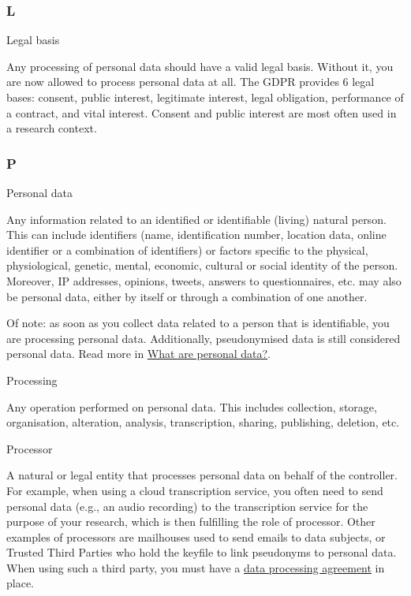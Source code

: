 \documentclass[
]{book}
\begin{document}
\hypertarget{l}{%
\subsubsection{L}\label{l}}

Legal basis

Any processing of personal data should have a valid legal basis. Without it,
you are now allowed to process personal data at all. The GDPR provides 6 legal
bases: consent, public interest, legitimate interest, legal obligation,
performance of a contract, and vital interest. Consent and public interest are
most often used in a research context.

\hypertarget{p}{%
\subsubsection{P}\label{p}}

Personal data

Any information related to an identified or identifiable (living) natural
person. This can include identifiers (name, identification number, location
data, online identifier or a combination of identifiers) or factors specific
to the physical, physiological, genetic, mental, economic, cultural or social
identity of the person. Moreover, IP addresses, opinions, tweets, answers to
questionnaires, etc. may also be personal data, either by itself or through a
combination of one another.

Of note: as soon as you collect data related to a person that is identifiable,
you are processing personal data. Additionally, pseudonymised data is still
considered personal data. Read more in
\protect\hyperlink{personal-data}{What are personal data?}.

Processing

Any operation performed on personal data. This includes collection, storage,
organisation, alteration, analysis, transcription, sharing, publishing, deletion, etc.

Processor

A natural or legal entity that processes personal data on behalf of the
controller. For example, when using a cloud transcription service, you often
need to send personal data (e.g., an audio recording) to the transcription
service for the purpose of your research, which is then fulfilling the role
of processor. Other examples of processors are mailhouses used to send emails
to data subjects, or Trusted Third Parties who hold the keyfile to link
pseudonyms to personal data. When using such a third party, you must have a
\protect\hyperlink{data-processing-agreement}{data processing agreement} in place.
\end{document}
